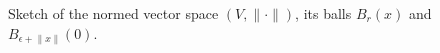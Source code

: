 \documentclass{article}
\theoremstyle{definition}
\numberwithin{equation}{section}
\begin{document}
\begin{figure}
    \centering
    \caption{Sketch of the normed vector space \( (V, \lVert \cdot \rVert) \), its balls \( B_r(x) \) and \( B_{\epsilon + \lVert x \rVert}(0) \).}
\end{figure}
\end{document}
